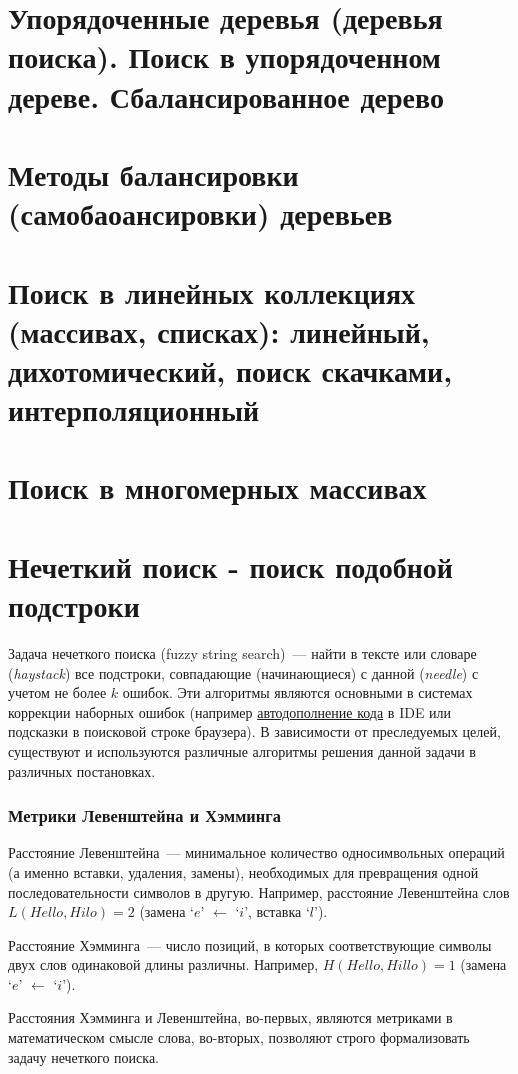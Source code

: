 \section{Упорядоченные деревья (деревья поиска). Поиск в упорядоченном дереве.  Сбалансированное дерево}
\section{Методы балансировки (самобаоансировки) деревьев}
\section{Поиск в линейных коллекциях (массивах, списках): линейный, дихотомический, поиск скачками, интерполяционный}
\section{Поиск в многомерных массивах}
\section{Нечеткий поиск - поиск подобной подстроки}
Задача нечеткого поиска (fuzzy string search)~--- найти в тексте или словаре (\textit{haystack}) все подстроки, совпадающие
(начинающиеся) с данной (\textit{needle}) с учетом не более \(k\) ошибок.
Эти алгоритмы являются основными в системах коррекции наборных ошибок
(например \href{https://en.wikipedia.org/wiki/Code_completion}{автодополнение кода} в IDE или подсказки в поисковой строке браузера).
В зависимости от преследуемых целей, существуют и используются различные алгоритмы решения данной задачи в различных постановках.

\subsubsection{Метрики Левенштейна и Хэмминга}
Расстояние Левенштейна~--- минимальное количество односимвольных операций (а именно вставки, удаления, замены),
необходимых для превращения одной последовательности символов в другую.
Например, расстояние Левенштейна слов \(L(Hello, Hilo) = 2\) (замена `\(e\)' \(\gets\) `\(i\)', вставка `\(l\)').

Расстояние Хэмминга~--- число позиций, в которых соответствующие символы двух слов одинаковой длины различны. Например,
\(H(Hello, Hillo) = 1\) (замена `\(e\)' \(\gets\) `\(i\)').

Расстояния Хэмминга и Левенштейна, во-первых, являются метриками в математическом смысле слова, во-вторых, позволяют строго
формализовать задачу нечеткого поиска.

